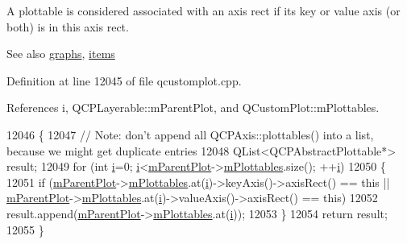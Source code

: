 A plottable is considered associated with an axis rect if its key or value axis (or both) is in this axis rect.

\begin{DoxySeeAlso}{See also}
\hyperlink{class_q_c_p_axis_rect_afa4ff90901d9275f670e24b40e3c1b25}{graphs}, \hyperlink{class_q_c_p_axis_rect_a0f17ed539962cfcbaca8ce0b1776c840}{items} 
\end{DoxySeeAlso}


Definition at line 12045 of file qcustomplot.\+cpp.



References i, Q\+C\+P\+Layerable\+::m\+Parent\+Plot, and Q\+Custom\+Plot\+::m\+Plottables.


\begin{DoxyCode}
12046 \{
12047   \textcolor{comment}{// Note: don't append all QCPAxis::plottables() into a list, because we might get duplicate entries}
12048   QList<QCPAbstractPlottable*> result;
12049   \textcolor{keywordflow}{for} (\textcolor{keywordtype}{int} \hyperlink{_comparision_pictures_2_createtest_image_8m_a6f6ccfcf58b31cb6412107d9d5281426}{i}=0; \hyperlink{_comparision_pictures_2_createtest_image_8m_a6f6ccfcf58b31cb6412107d9d5281426}{i}<\hyperlink{class_q_c_p_layerable_aa2a528433e44db02b8aef23c1f9f90ed}{mParentPlot}->\hyperlink{class_q_custom_plot_a62bf8e4e7f8d23fc1e9301ba0148269f}{mPlottables}.size(); ++\hyperlink{_comparision_pictures_2_createtest_image_8m_a6f6ccfcf58b31cb6412107d9d5281426}{i})
12050   \{
12051     \textcolor{keywordflow}{if} (\hyperlink{class_q_c_p_layerable_aa2a528433e44db02b8aef23c1f9f90ed}{mParentPlot}->\hyperlink{class_q_custom_plot_a62bf8e4e7f8d23fc1e9301ba0148269f}{mPlottables}.at(\hyperlink{_comparision_pictures_2_createtest_image_8m_a6f6ccfcf58b31cb6412107d9d5281426}{i})->keyAxis()->axisRect() == \textcolor{keyword}{this} ||
      \hyperlink{class_q_c_p_layerable_aa2a528433e44db02b8aef23c1f9f90ed}{mParentPlot}->\hyperlink{class_q_custom_plot_a62bf8e4e7f8d23fc1e9301ba0148269f}{mPlottables}.at(\hyperlink{_comparision_pictures_2_createtest_image_8m_a6f6ccfcf58b31cb6412107d9d5281426}{i})->valueAxis()->axisRect() == \textcolor{keyword}{this})
12052       result.append(\hyperlink{class_q_c_p_layerable_aa2a528433e44db02b8aef23c1f9f90ed}{mParentPlot}->\hyperlink{class_q_custom_plot_a62bf8e4e7f8d23fc1e9301ba0148269f}{mPlottables}.at(\hyperlink{_comparision_pictures_2_createtest_image_8m_a6f6ccfcf58b31cb6412107d9d5281426}{i}));
12053   \}
12054   \textcolor{keywordflow}{return} result;
12055 \}
\end{DoxyCode}
\hypertarget{class_q_c_p_axis_rect_af24b46954ce27a26b23770cdb8319080}{}
